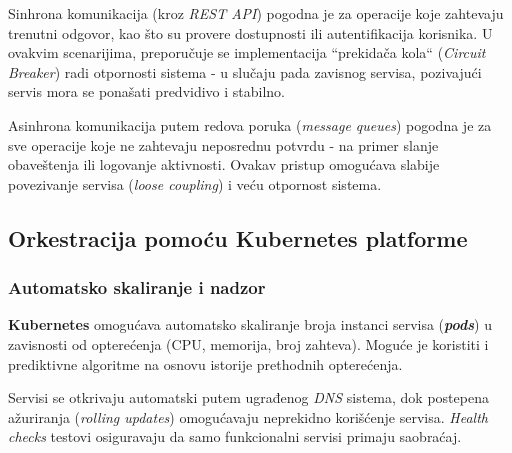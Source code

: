 \documentclass[12pt]{article}
\begin{document}
    Sinhrona komunikacija (kroz \textit{REST API}) pogodna je za operacije koje zahtevaju trenutni odgovor, 
    kao što su provere dostupnosti ili autentifikacija korisnika. U ovakvim scenarijima, preporučuje se 
    implementacija ``prekidača kola`` (\textit{Circuit Breaker}) radi otpornosti sistema - u slučaju 
    pada zavisnog servisa, pozivajući servis mora se ponašati predvidivo i stabilno.

    Asinhrona komunikacija putem redova poruka (\textit{message queues}) pogodna je za sve 
    operacije koje ne zahtevaju neposrednu potvrdu - na primer slanje obaveštenja ili 
    logovanje aktivnosti. Ovakav pristup omogućava slabije povezivanje servisa (\textit{loose coupling}) 
    i veću otpornost sistema.

    \newpage

    \subsection{Orkestracija pomoću Kubernetes platforme}

    \subsubsection*{Automatsko skaliranje i nadzor}

    \textbf{Kubernetes} omogućava automatsko skaliranje broja instanci servisa (\textbf{\textit{pods}}) u 
    zavisnosti od opterećenja (CPU, memorija, broj zahteva). Moguće je koristiti i prediktivne 
    algoritme na osnovu istorije prethodnih opterećenja.

    Servisi se otkrivaju automatski putem ugrađenog \textit{DNS} sistema, dok
    postepena ažuriranja (\textit{rolling updates}) omogućavaju neprekidno korišćenje servisa. \textit{Health checks} testovi osiguravaju da 
    samo funkcionalni servisi primaju saobraćaj.


\newpage
\printbibliography[title={Literatura}]
\end{document}

